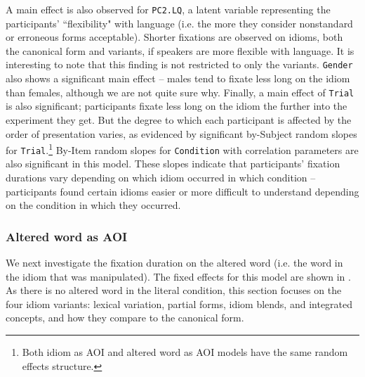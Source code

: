 \documentclass[output=paper,modfonts,nonflat]{langsci/langscibook}
\begin{document}
A main effect is also observed for \texttt{PC2.LQ}, a latent variable representing the participants' ``flexibility" with language (i.e. the more they consider nonstandard or erroneous forms acceptable). Shorter fixations are observed on idioms, both the canonical form and variants, if speakers are more flexible with language. It is interesting to note that this finding is not  restricted to only the variants. \texttt{Gender} also shows a significant main effect -- males tend to fixate less long on the idiom than females, although we are not quite sure why. Finally, a main effect of \texttt{Trial} is also significant; participants fixate less long on the idiom the further into the experiment they get. But the degree to which each participant is affected by the order of presentation varies, as evidenced by significant by-Subject random slopes for \texttt{Trial}.\footnote{Both idiom as AOI and altered word as AOI models have the same random effects structure.} By-Item random slopes for \texttt{Condition} with correlation parameters are also significant in this model. These slopes indicate that participants' fixation durations vary depending on which idiom occurred in which condition -- participants found certain idioms easier or more difficult to understand depending on the condition in which they occurred. 



\subsubsection{Altered word as AOI}

We next investigate the fixation duration on the altered word (i.e. the word in the idiom that was manipulated). The fixed effects for this model are shown in . As there is no altered word in the literal condition, this section focuses on the four idiom variants: lexical variation, partial forms, idiom blends, and integrated concepts, and how they compare to the canonical form. 
\end{document}
